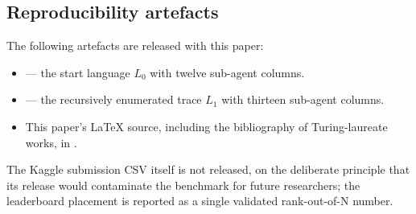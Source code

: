 \subsection{Reproducibility artefacts}

The following artefacts are released with this paper:
\begin{itemize}
\item {} --- the start
language $L_0$ with twelve sub-agent columns.
\item {} --- the recursively
enumerated trace $L_1$ with thirteen sub-agent columns.
\item This paper's \LaTeX{} source, including the
 bibliography of Turing-laureate works, in
.
\end{itemize}

The Kaggle submission CSV itself is not released, on the
deliberate principle that its release would contaminate the
benchmark for future researchers; the leaderboard placement is
reported as a single validated rank-out-of-N number.
